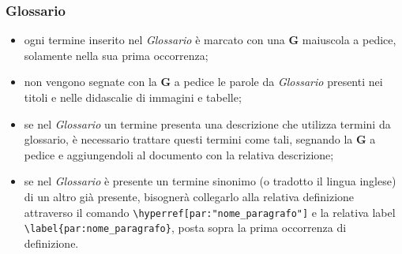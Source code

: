 \subsubsection{Glossario}
\begin{itemize}
\item ogni termine inserito nel \textit{Glossario} è marcato con una \textbf{G} maiuscola a pedice, solamente nella sua prima occorrenza;
\item non vengono segnate con la \textbf{G} a pedice le parole da \textit{Glossario} presenti nei titoli e nelle didascalie di immagini e tabelle;
\item se nel \textit{Glossario} un termine presenta una descrizione che utilizza termini da glossario, è necessario trattare questi termini come tali, segnando la \textbf{G} a pedice e aggiungendoli al documento con la relativa descrizione;
\item se nel \textit{Glossario} è presente un termine sinonimo (o tradotto il lingua inglese) di un altro già presente, bisognerà collegarlo alla relativa definizione attraverso il comando \verb|\hyperref[par:"nome_paragrafo"]| e la relativa label \verb|\label{par:nome_paragrafo}|, posta sopra la prima occorrenza di definizione.
\end{itemize}

